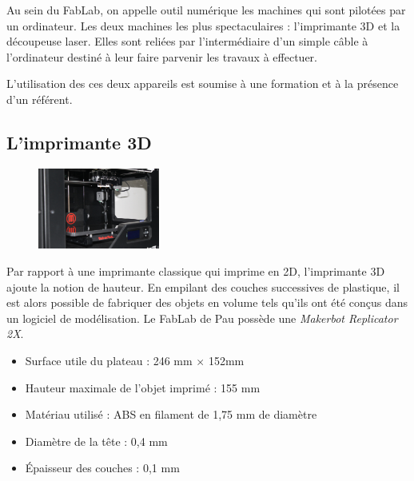 Au sein du FabLab, on appelle outil numérique les machines qui sont pilotées par un ordinateur. Les deux machines les plus spectaculaires : l'imprimante 3D et la découpeuse laser. Elles sont reliées par l'intermédiaire d'un simple câble à l'ordinateur destiné à leur faire parvenir les travaux à effectuer.

\begin{center}
L'utilisation des ces deux appareils est soumise à une formation et à la présence d'un référent.
\end{center}
\subsection{L'imprimante 3D}
\begin{figure}
\centering
    \includegraphics[width=40mm]{Makerbot2X.jpg}
    \label{fig:imprimante3D}
\end{figure}

Par rapport à une imprimante classique qui imprime en 2D, l'imprimante 3D ajoute la notion de hauteur. En empilant des couches successives de plastique, il est alors possible de fabriquer des objets en volume tels qu'ils ont été conçus dans un logiciel de modélisation.
Le FabLab de Pau possède une \textit{Makerbot Replicator 2X}.

\begin{itemize}
  \item Surface utile du plateau : 246 mm $\times$ 152mm
  \item Hauteur maximale de l'objet imprimé : 155 mm
  \item Matériau utilisé : ABS en filament de 1,75 mm de diamètre
  \item Diamètre de la tête : 0,4 mm
  \item Épaisseur des couches : 0,1 mm
\end{itemize}

